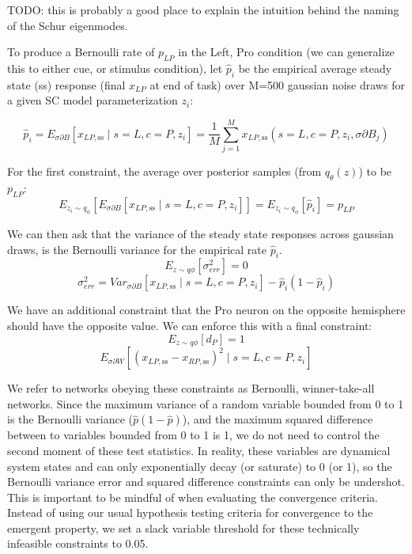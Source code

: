 \documentclass[11pt]{article}
\begin{document}
TODO: this is probably a good place to explain the intuition behind the naming of the Schur eigenmodes.

To produce a Bernoulli rate of $p_{LP}$ in the Left, Pro condition (we can generalize this to either cue, or stimulus condition), let $\hat{p}_i$ be the empirical average steady state (ss) response (final $x_{LP}$ at end of task) over M=500 gaussian noise draws for a given SC model parameterization $z_i$:

\begin{equation}
 \hat{p}_i = E_{\sigma \partial B} \left[ x_{LP,\text{ss}} \mid s=L, c=P, z_i \right] = \frac{1}{M}\sum_{j=1}^M x_{LP,\text{ss}}(s=L, c=P, z_i, \sigma \partial B_j)
 \end{equation}

For the first constraint, the average over posterior samples (from $q_\theta(z)$) to be $p_{LP}$:
\begin{equation}
E_{z_i \sim q_\phi} \left[ E_{\sigma \partial B} \left[ x_{LP,\text{ss}} \mid s=L, c=P, z_i \right] \right] = E_{z_i \sim q_\phi} \left[ \hat{p}_i \right] = p_{LP}
\end{equation}

We can then ask that the variance of the steady state responses across gaussian draws, is the Bernoulli variance for the empirical rate $\hat{p}_i$.
\begin{equation}
E_{z \sim q\phi} \left[ \sigma^2_{err} \right] = 0
\end{equation}
\begin{equation}
\sigma^2_{err} = Var_{\sigma \partial B} \left[ x_{LP,\text{ss}} \mid s=L, c=P, z_i \right] - \hat{p}_i(1 - \hat{p}_i)
\end{equation}

We have an additional constraint that the Pro neuron on the opposite hemisphere should have the opposite value.  We can enforce this with a final constraint:
\begin{equation}
E_{z \sim q\phi} \left[ d_P \right] = 1
\end{equation}
\begin{equation}
E_{\sigma \partial W} \left[ (x_{LP,\text{ss}} - x_{RP,\text{ss}})^2  \mid s=L, c=P, z_i \right]
\end{equation}

We refer to networks obeying these constraints as Bernoulli, winner-take-all networks.  Since the maximum variance of a random variable bounded from 0 to 1 is the Bernoulli variance ($\hat{p}(1-\hat{p})$), and the maximum squared difference between to variables bounded from 0 to 1 is 1, we do not need to control the second moment of these test statistics.  In reality, these variables are dynamical system states and can only exponentially decay (or saturate) to 0 (or 1), so the Bernoulli variance error and squared difference constraints can only be undershot.  This is important to be mindful of when evaluating the convergence criteria.  Instead of using our usual hypothesis testing criteria for convergence to the emergent property, we set a slack variable threshold for these technically infeasible constraints to 0.05.
\end{document}
